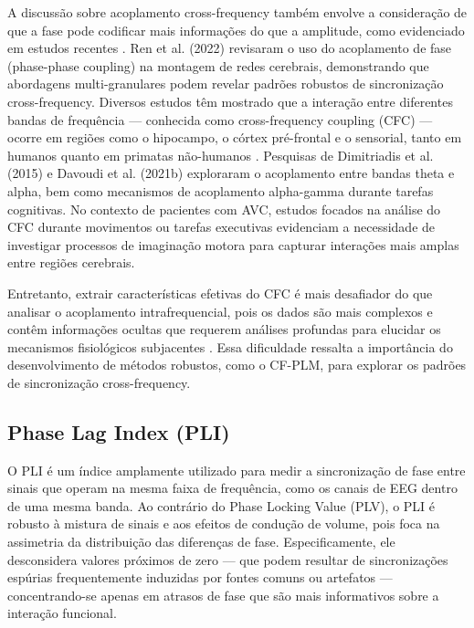 A discussão sobre acoplamento cross-frequency também envolve a consideração de que a fase pode codificar mais informações do que a amplitude, como evidenciado em estudos recentes \cite{autor2020}. Ren et al. (2022) \cite{ren2022multi} revisaram o uso do acoplamento de fase (phase-phase coupling) na montagem de redes cerebrais, demonstrando que abordagens multi-granulares podem revelar padrões robustos de sincronização cross-frequency. Diversos estudos têm mostrado que a interação entre diferentes bandas de frequência — conhecida como cross-frequency coupling (CFC) — ocorre em regiões como o hipocampo, o córtex pré-frontal e o sensorial, tanto em humanos quanto em primatas não-humanos \cite{mormann2005, canolty2006, jensen2007, khamechian2020}. Pesquisas de Dimitriadis et al. (2015) e Davoudi et al. (2021b) exploraram o acoplamento entre bandas theta e alpha, bem como mecanismos de acoplamento alpha-gamma durante tarefas cognitivas. No contexto de pacientes com AVC, estudos focados na análise do CFC durante movimentos ou tarefas executivas evidenciam a necessidade de investigar processos de imaginação motora para capturar interações mais amplas entre regiões cerebrais.

Entretanto, extrair características efetivas do CFC é mais desafiador do que analisar o acoplamento intrafrequencial, pois os dados são mais complexos e contêm informações ocultas que requerem análises profundas para elucidar os mecanismos fisiológicos subjacentes \cite{ren2022multi}. Essa dificuldade ressalta a importância do desenvolvimento de métodos robustos, como o CF-PLM, para explorar os padrões de sincronização cross-frequency.

\subsection{Phase Lag Index (PLI)}

O PLI é um índice amplamente utilizado para medir a sincronização de fase entre sinais que operam na mesma faixa de frequência, como os canais de EEG dentro de uma mesma banda. Ao contrário do Phase Locking Value (PLV), o PLI é robusto à mistura de sinais e aos efeitos de condução de volume, pois foca na assimetria da distribuição das diferenças de fase. Especificamente, ele desconsidera valores próximos de zero — que podem resultar de sincronizações espúrias frequentemente induzidas por fontes comuns ou artefatos — concentrando-se apenas em atrasos de fase que são mais informativos sobre a interação funcional.

